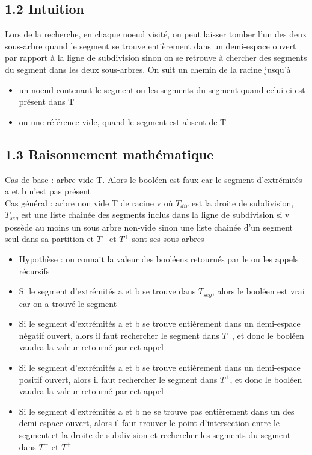 \documentclass[a4paper,12pt]{report}	%
\begin{document}
	\newpage
	{\subsection*{1.2 Intuition}}
	
	\noindent Lors de la recherche, en chaque noeud visité, on peut laisser tomber l'un des deux sous-arbre quand le segment se trouve entièrement dans un demi-espace ouvert par rapport à la ligne de subdivision sinon on se retrouve à chercher des segments du segment dans les deux sous-arbres. On suit un chemin de la racine jusqu'à
\begin{itemize}
\item un noeud contenant le segment ou les segments du segment quand celui-ci est présent dans T 
\item ou  une référence vide, quand le segment est absent de T
\end{itemize}

	{\subsection*{1.3 Raisonnement mathématique}}
	
\noindent 
Cas de base : arbre vide T. Alors le booléen est faux car le segment d'extrémités a et b n'est pas présent\\
Cas général : arbre non vide T de racine v où $T_{div}$ est la droite de subdivision, $T_{seg}$ est une liste chainée des segments inclus dans la ligne de subdivision si v possède au moins un sous arbre non-vide sinon une liste chainée d'un segment seul dans sa partition et $T^{-}$ et $T^{+}$ sont ses sous-arbres
\begin{itemize}
\item Hypothèse : on connait la valeur des booléens retournés par le ou les appels récursifs
\item Si le segment d'extrémités a et b se trouve dans $T_{seg}$, alors le booléen est vrai car on a trouvé le segment
\item Si le segment d'extrémités a et b se trouve entièrement dans un demi-espace négatif ouvert, alors il faut rechercher le segment dans $T^{-}$, et donc le booléen vaudra la valeur retourné par cet appel
\item Si le segment d'extrémités a et b se trouve entièrement dans un demi-espace positif ouvert, alors il faut rechercher le segment dans $T^{+}$, et donc le booléen vaudra la valeur retourné par cet appel
\item Si le segment d'extrémités a et b ne se trouve pas entièrement dans un des demi-espace ouvert, alors il faut trouver le point d'intersection entre le segment et la droite de subdivision et rechercher les segments du segment dans $T^{-}$ et $T^{+}$
\end{itemize}
\end{document}
